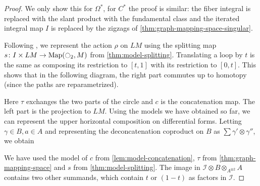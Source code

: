 \documentclass{scrartcl}
\theoremstyle{plain}
\theoremstyle{definition}
\DeclareMathOperator{\Map}{Map}
\begin{document}
\begin{proof}
    We only show this for $\Omega^*$, for $C^*$ the proof is similar: the fiber integral is replaced with the slant product with the fundamental class and the iterated integral map $I$ is replaced by the zigzags of \cref{thm:graph-mapping-space-singular}.

Following \cite[4.3]{naef2019string}, we represent the action $\rho$ on $LM$ using the splitting map $s\colon I \times LM\to\Map(\ocircle_2, M)$ from \cref{thm:model-splitting}. Translating a loop by $t$ is the same as composing its restriction to $[t, 1]$ with its restriction to $[0, t]$. This shows that in the following diagram, the right part commutes up to homotopy (since the paths are reparametrized).

\begin{center}
\end{center}
Here $\tau$ exchanges the two parts of the circle and $c$ is the concatenation map. The left part is the projection to $LM$. Using the models we have obtained so far, we can represent the upper horizontal composition on differential forms. Letting $\gamma\in B, a\in A$ and representing the deconcatenation coproduct on $B$ as $\sum \gamma'\otimes\gamma''$, we obtain 

\begin{center}
\end{center}

We have used the model of $c$ from \cref{lem:model-concatenation}, $\tau$ from \cref{thm:graph-mapping-space} and $s$ from \cref{thm:model-splitting}. The image in $\mathcal I \otimes B\otimes_{A^{\otimes 2}} A$ contains two other summands, which contain $t$ or $(1-t)$ as factors in $\mathcal I$. 


\end{proof}
\end{document}
